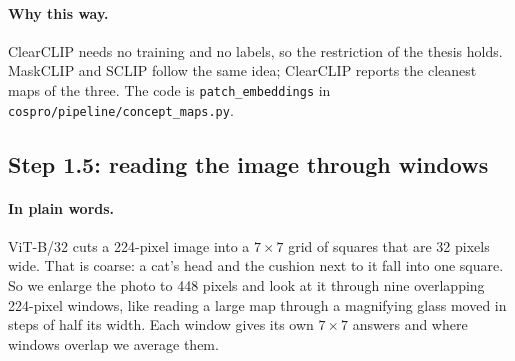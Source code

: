 \documentclass[11pt]{article}
\newcommand{\plain}{\paragraph{In plain words.}}
\newcommand{\why}{\paragraph{Why this way.}}
\begin{document}
\why ClearCLIP needs no training and no labels, so the restriction of the thesis holds. MaskCLIP and SCLIP follow
the same idea; ClearCLIP reports the cleanest maps of the three. The code is \texttt{patch\_embeddings} in
\texttt{cospro/pipeline/concept\_maps.py}.

\subsection{Step 1.5: reading the image through windows}
\plain ViT-B/32 cuts a 224-pixel image into a $7\times7$ grid of squares that are 32 pixels wide. That is coarse: a
cat's head and the cushion next to it fall into one square. So we enlarge the photo to 448 pixels and look at it
through nine overlapping 224-pixel windows, like reading a large map through a magnifying glass moved in steps of
half its width. Each window gives its own $7\times7$ answers and where windows overlap we average them.
\end{document}
